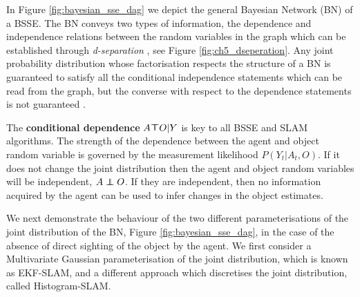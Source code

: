 In Figure \ref{fig:bayesian_sse_dag} we depict the general Bayesian Network (BN) of a BSSE. The BN conveys two types of
information, the dependence and independence relations between the random variables in the graph which can be established
through \textit{d-separation} \cite{BayesBall}, see Figure \ref{fig:ch5_dseperation}. Any joint probability distribution 
whose factorisation  respects the structure of a BN is guaranteed to satisfy all the conditional independence 
statements which can be read from the graph, but the converse with respect to the dependence statements is 
not guaranteed \cite[p.43]{barberBRML2012}. 

The \textbf{conditional dependence} $A \dependent O | Y$ is key to all BSSE and SLAM algorithms. The strength of the dependence 
between the agent and object random variable is governed by the measurement likelihood $P(Y_t|A_t,O)$. If it does not change the 
joint distribution then the agent and object random variables will be independent, $A \independent O$. If they are independent, 
then no information acquired by the agent can be used to infer changes in the object estimates.


We next demonstrate the behaviour of the two different parameterisations of the joint distribution of the BN, 
Figure \ref{fig:bayesian_sse_dag}, in the case of the absence of direct sighting of the object by the agent. We first consider a
Multivariate Gaussian parameterisation of the joint distribution, which is known as EKF-SLAM, and 
a different approach which discretises the joint distribution, called Histogram-SLAM.


